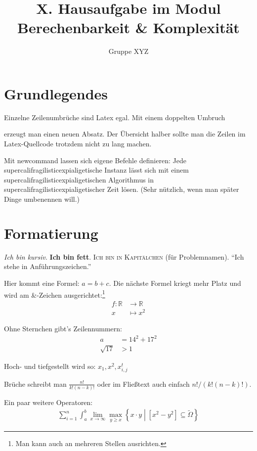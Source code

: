 \documentclass[a4paper,onecolumn,oneside,12pt,ngerman]{article}
\date{}
\title{X. Hausaufgabe im Modul \\ \glqq Berechenbarkeit \& Komplexität\grqq} %
\author{Gruppe XYZ} %
\theoremstyle{plain} %
\theoremstyle{definition} %
\theoremstyle{remark} %
\theoremstyle{plain}
\newcommand{\RR}{\mathbb{R}} %
\begin{document}

\maketitle



\section{Grundlegendes}
Einzelne Zeilenumbrüche
sind 
Latex egal.
Mit einem doppelten Umbruch

erzeugt man einen neuen Absatz.
Der Übersicht halber sollte man die Zeilen im Latex-Quellcode trotzdem nicht zu lang machen.

Mit newcommand lassen sich eigene Befehle definieren:
\newcommand{\sfe}{supercalifragilisticexpialigetisch}
Jede \sfe{}e Instanz lässt sich mit einem \sfe{}en Algorithmus in \sfe{}er Zeit lösen.
(Sehr nützlich, wenn man später Dinge umbenennen will.)

\section{Formatierung}
\textit{Ich bin kursiv}.
\textbf{Ich bin fett}.
\textsc{Ich bin in Kapitälchen} (für Problemnamen).
\enquote{Ich stehe in Anführungszeichen.}

Hier kommt eine Formel: $a = b + c$.
Die nächste Formel kriegt mehr Platz und wird am \&-Zeichen ausgerichtet:\footnote{Man kann auch an mehreren Stellen ausrichten.}
\begin{align*}
f : \RR &\to \RR \\
x &\mapsto x^2
\end{align*}

Ohne Sternchen gibt's Zeilennummern:
\begin{align}
a &= 14^2 + 17^2 \\
\sqrt{17} &> 1 \label{eq:wurzel}
\end{align}

Hoch- und tiefgestellt wird so: $x_1, x^2, x_{i,j}^t$

Brüche schreibt man $\frac{n!}{k!(n-k)!}$ oder im Fließtext auch einfach $n!/(k!(n-k)!)$.

Ein paar weitere Operatoren:
\begin{align*}
\sum_{i=1}^n \int_a^b \lim_{x \to \infty} \max_{y \geq x} \left\{ x \cdot y \middle| \left[ x^2 - y^2 \right] \subseteq \tilde{\Omega} \right\}
\end{align*}
\end{document}
